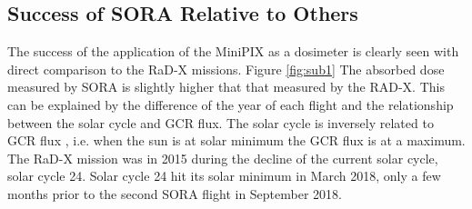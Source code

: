\subsection{Success of SORA Relative to Others}
The success of the application of the MiniPIX as a dosimeter is clearly seen with direct comparison to the RaD-X missions. Figure \ref{fig:sub1}
The absorbed dose measured by SORA is slightly higher that that measured by the RAD-X.
This can be explained by the difference of the year of each flight and the relationship between the solar cycle and GCR flux.
The solar cycle is inversely related to GCR flux \cite{hathaway}, i.e. when the sun is at solar minimum the GCR flux is at a maximum.
The RaD-X mission was in 2015 during the decline of the current solar cycle, solar cycle \num{24}. 
Solar cycle 24 hit its solar minimum in March 2018, only a few months prior to the second SORA flight in September 2018.



